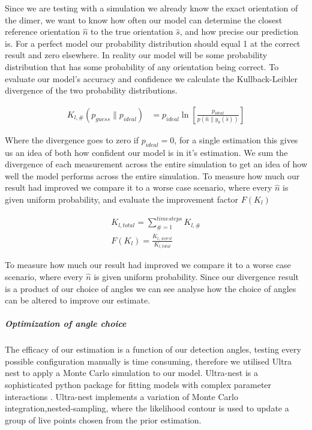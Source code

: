 \documentclass[review,3p]{elsarticle}
\begin{document}
Since we are testing with a simulation we already know the exact orientation of the dimer, we want to know how often our model can determine the closest reference orientation $\hat{n}$ to the true orientation $\hat{s}$, and how precise our prediction is. For a perfect model our probability distribution should equal 1 at the correct result and zero elsewhere. In reality our model will be some probability distribution that has some probability of any orientation being correct. To evaluate our model's accuracy and confidence we calculate the Kullback-Leibler divergence of the two probability distributions. 

\begin{eqnarray}
	K_{l, \#}(p_{guess} \parallel p_{ideal}) &= 
	p_{ideal} \ln \left[
	\frac{p_{ideal}}{p(\hat{n}\parallel y_k(\hat{s}))}
	\right]
\end{eqnarray}

Where the divergence goes to zero if $p_{ideal}=0$, for a single estimation this gives us an idea of both how confident our model is in it's estimation. We sum the divergence of each measurement across the entire simulation to get an idea of how well the model performs across the entire simulation. To measure how much our result had improved we compare it to a worse case scenario, where every $\hat{n}$ is given uniform probability, and evaluate the improvement factor $F(K_l)$

\begin{eqnarray}
	K_{l,total} = \sum\limits_{\# =1}^{timesteps} K_{l,\#} \\
	F(K_l) = \frac{K_{l,\ worst}}{K_{l,total}}
\end{eqnarray}

To measure how much our result had improved we compare it to a worse case scenario, where every $\hat{n}$ is given uniform probability. Since our divergence result is a product of our choice of angles we can see analyse how the choice of angles can be altered to improve our estimate.  

\subparagraph{Optimization of angle choice}
\label{2.2}
The efficacy of our estimation is a function of our detection angles, testing every possible configuration manually is time consuming, therefore we utilised Ultra nest to apply a Monte Carlo simulation to our model. Ultra-nest is a sophisticated python package for fitting models with complex parameter interactions \cite{Ultranest}. Ultra-nest implements a variation of Monte Carlo integration,nested-sampling, where the likelihood contour is used to update a group of live points chosen from the prior estimation.
\end{document}
